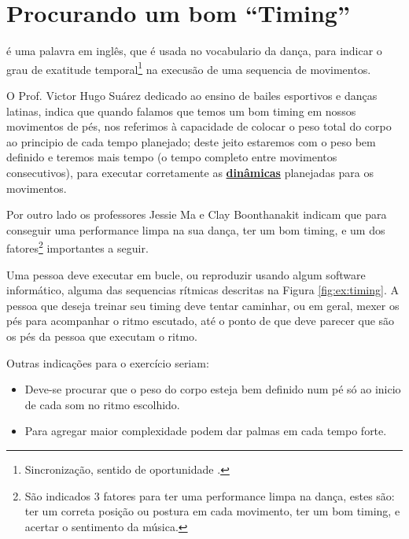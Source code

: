
\section{Procurando um bom ``Timing''}
\label{sec:dancetimming}

\begin{definition}[Timing]
é uma palavra em inglês, que é usada no vocabulario da dança, 
para indicar o grau de exatitude temporal\footnote{%
Sincronização,
sentido de oportunidade \cite{TimingDef}.} 
na execusão de uma sequencia de movimentos.%
\end{definition}

O Prof. Victor Hugo Suárez dedicado ao ensino de bailes esportivos e danças latinas,
indica que quando falamos que temos um bom timing \cite{TimingDef2} em nossos movimentos de pés, 
nos referimos à capacidade de colocar o peso total do corpo ao principio de cada tempo planejado;
deste jeito estaremos com o peso bem definido e teremos mais tempo 
(o tempo completo entre movimentos  consecutivos), 
para executar corretamente as \hyperref[sec:musicalidade:dinamicas]{\textbf{dinâmicas}} 
planejadas para os movimentos.

Por outro lado os professores Jessie Ma e Clay Boonthanakit
indicam \cite{TimingDef3} que para conseguir uma performance limpa na sua dança,
ter um bom timing, e
um dos fatores\footnote{São indicados 3 fatores para ter uma performance limpa na dança,
estes são: ter um correta posição ou postura em cada movimento, ter um bom timing, e 
acertar o sentimento da música.} importantes a seguir.

\begin{example}
\label{ex:timing1}
Uma pessoa deve executar em bucle, ou reproduzir usando algum software informático,
alguma das sequencias rítmicas descritas na Figura \ref{fig:ex:timing}.
A pessoa que deseja treinar seu timing deve tentar caminhar, ou em geral, 
mexer os pés para acompanhar o ritmo escutado,
até o ponto de que deve parecer que são os pés da pessoa que executam o ritmo.

Outras indicações para o exercício seriam:
\begin{itemize}
\item Deve-se procurar que o peso do corpo esteja bem definido num pé só 
ao inicio de cada som no ritmo escolhido.
\item Para agregar maior complexidade podem dar palmas em cada tempo forte.
\end{itemize}
\vspace{-10pt}
\end{example}


